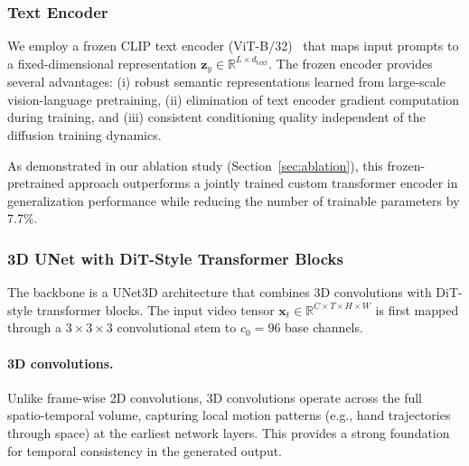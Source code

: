 \documentclass{ieeeaccess}
\begin{document}
\subsubsection{Text Encoder}

We employ a frozen CLIP text encoder (ViT-B/32)~\cite{radford2021clip} that maps input prompts to a fixed-dimensional representation $\mathbf{z}_y \in \mathbb{R}^{L \times d_\mathrm{text}}$. The frozen encoder provides several advantages: (i) robust semantic representations learned from large-scale vision-language pretraining, (ii) elimination of text encoder gradient computation during training, and (iii) consistent conditioning quality independent of the diffusion training dynamics.

As demonstrated in our ablation study (Section~\ref{sec:ablation}), this frozen-pretrained approach outperforms a jointly trained custom transformer encoder in generalization performance while reducing the number of trainable parameters by 7.7\%.

\subsubsection{3D UNet with DiT-Style Transformer Blocks}

The backbone is a UNet3D architecture that combines 3D convolutions with DiT-style transformer blocks. The input video tensor $\mathbf{x}_t \in \mathbb{R}^{C \times T \times H \times W}$ is first mapped through a $3 \times 3 \times 3$ convolutional stem to $c_0 = 96$ base channels.

\paragraph{3D convolutions.} Unlike frame-wise 2D convolutions, 3D convolutions operate across the full spatio-temporal volume, capturing local motion patterns (e.g., hand trajectories through space) at the earliest network layers. This provides a strong foundation for temporal consistency in the generated output.
\end{document}
